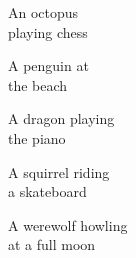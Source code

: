 \begin{figure*}[h]
\vspace{1ex}
\begin{minipage}[t]{.025\textwidth}
     \vspace{0pt}
\end{minipage}%
\hspace{1ex}%
\begin{minipage}[t]{0.98\figwidth}
    \vspace{2mm}
    \begin{minipage}[t]{0.2\textwidth}
        \centering
        An octopus\\playing chess
    \end{minipage}%
    \begin{minipage}[t]{0.2\textwidth}
        \centering
        A penguin at\\the beach
    \end{minipage}%
    \begin{minipage}[t]{0.2\textwidth}
        \centering
        A dragon playing\\the piano
    \end{minipage}%
    \begin{minipage}[t]{0.2\textwidth}
        \centering
        A squirrel riding\\a skateboard
    \end{minipage}%
    \begin{minipage}[t]{0.2\textwidth}
        \centering
        A werewolf howling\\at a full moon
    \end{minipage}%
\end{minipage}


\end{figure*}
